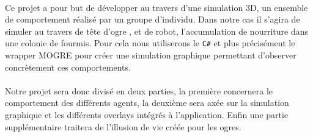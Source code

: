 \paragraph{}
Ce projet a pour but de développer au travers d'une simulation 3D, un
ensemble de comportement réalisé par un groupe d'individu. Dans notre cas il
s'agira de simuler au travers de tête d'ogre , et de robot, l'accumulation de
nourriture dans une colonie de fourmis. Pour cela nous utiliserons le
\verb!C#! et plus précisément le wrapper MOGRE pour créer une simulation
graphique permettant d'observer concrètement ces comportements.

\paragraph{}

Notre projet sera donc divisé en deux parties, la première concernera 
le comportement des différents agents, la deuxième sera axée sur la simulation
graphique et les différents overlays intégrés à l'application. Enfin une partie
supplémentaire traitera de l'illusion de vie créée pour les ogres.


